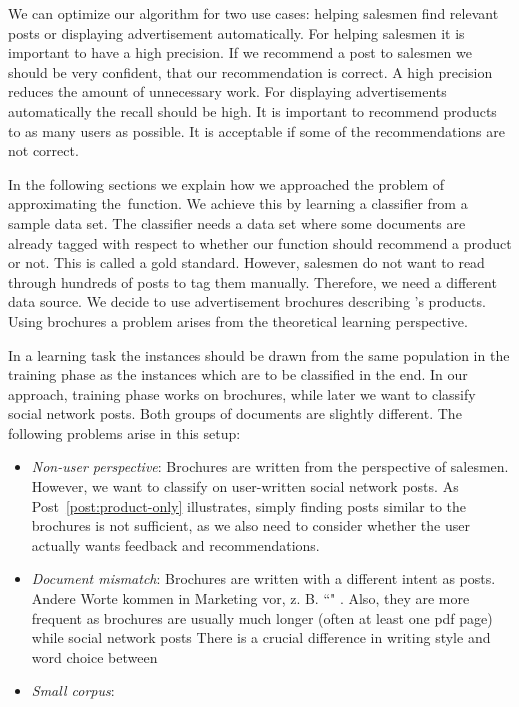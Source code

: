 We can optimize our algorithm for two use cases: helping salesmen find relevant posts or displaying advertisement automatically.
For helping salesmen it is important to have a high precision. 
If we recommend a post to salesmen we should be very confident, that our recommendation is correct. 
A high precision reduces the amount of unnecessary work.
For displaying advertisements automatically the recall should be high. 
It is important to recommend products to as many users as possible.
It is acceptable if some of the recommendations are not correct.   

In the following sections we explain how we approached the problem of approximating the~\nto function.
We achieve this by learning a classifier from a sample data set. 
The classifier needs a data set where some documents are already tagged with respect to whether our \nto function should recommend a product or not.
This is called a gold standard.
However, salesmen do not want to read through hundreds of posts to tag them manually.
Therefore, we need a different data source.
We decide to use advertisement brochures describing \acme's products. 
Using brochures a problem arises from the theoretical learning perspective.

In a learning task the instances should be drawn from the same population in the training phase as the instances which are to be classified in the end.\nr
In our approach, training phase works on brochures, while later we want to classify social network posts. 
Both groups of documents are slightly different.
The following problems arise in this setup:

 \begin{itemize}
 	\item
		\emph{Non-user perspective}:
		Brochures are written from the perspective of salesmen.
		However, we want to classify on user-written social network posts.
		As Post~\ref{post:product-only} illustrates, simply finding posts similar to the brochures is not sufficient, as we also need to consider whether the user actually wants feedback and recommendations.
	\item
		\emph{Document mismatch}:
		Brochures are written with a different intent as posts. 
		Andere Worte kommen in Marketing vor, z. B. ``" .
		Also, they are more frequent as brochures are usually much longer (often at least one pdf page) while social network posts 
		There is a crucial difference in writing style and word choice between 
	\item
		\emph{Small corpus}: 
 \end{itemize}

